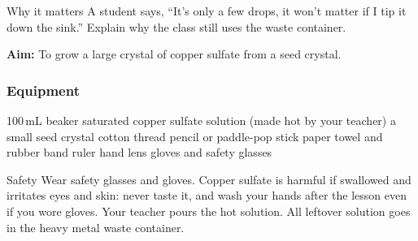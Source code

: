 \begin{wedo}{Why it matters}
A student says, ``It's only a few drops, it won't matter if I tip it down the sink.'' Explain why the class still uses the waste container.
\answerbox{3.5cm}
\end{wedo}


\textbf{Aim:} To grow a large crystal of copper sulfate from a seed crystal.

\subsubsection*{Equipment}
100\,mL beaker \textbullet{} saturated copper sulfate solution (made hot by your teacher) \textbullet{} a small seed crystal \textbullet{} cotton thread \textbullet{} pencil or paddle-pop stick \textbullet{} paper towel and rubber band \textbullet{} ruler \textbullet{} hand lens \textbullet{} gloves and safety glasses

\begin{center}
\end{center}

\begin{infobox}{Safety}
Wear safety glasses and gloves. Copper sulfate is harmful if swallowed and irritates eyes and skin: never taste it, and wash your hands after the lesson even if you wore gloves. Your teacher pours the hot solution. All leftover solution goes in the heavy metal waste container.
\end{infobox}

